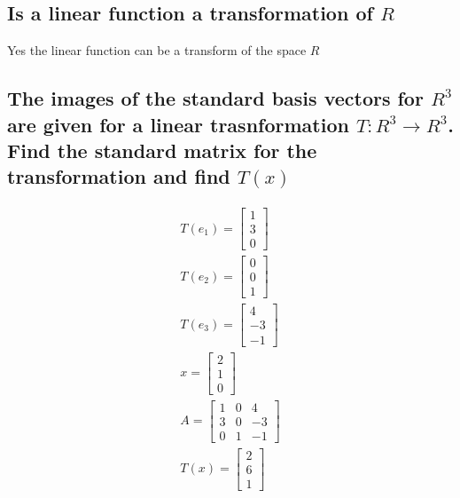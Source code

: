 \documentclass[12pt, a4paper]{article}
\begin{document}
		\subsection{Is a linear function a transformation of $R$}
			Yes the linear function can be a transform of the space $R$
		\subsection{The images of the standard basis vectors for $R^3$ are given for a linear trasnformation $T:R^3\rightarrow R^3$. Find the standard matrix for the transformation and find $T(x)$}
			\begin{align*}
					T(e_1)=
				\begin{bmatrix}
					1 \\
					3 \\
					0
				\end{bmatrix}\\[3mm]
					T(e_2)=
				\begin{bmatrix}
					0 \\
					0 \\
					1
				\end{bmatrix}\\[3mm]
					T(e_3)=
				\begin{bmatrix}
					4 \\
					-3 \\
					-1
				\end{bmatrix}\\[3mm]
					x=
				\begin{bmatrix}
					2 \\
					1 \\
					0
				\end{bmatrix}\\[3mm]
					A=
				\begin{bmatrix}
					1 & 0 & 4 \\
					3 & 0 & -3\\
					0 & 1 & -1
				\end{bmatrix}\\[3mm]
					T(x)=
				\begin{bmatrix}
					2 \\
					6 \\
					1
				\end{bmatrix}\\[3mm]
			\end{align*}
\end{document}
